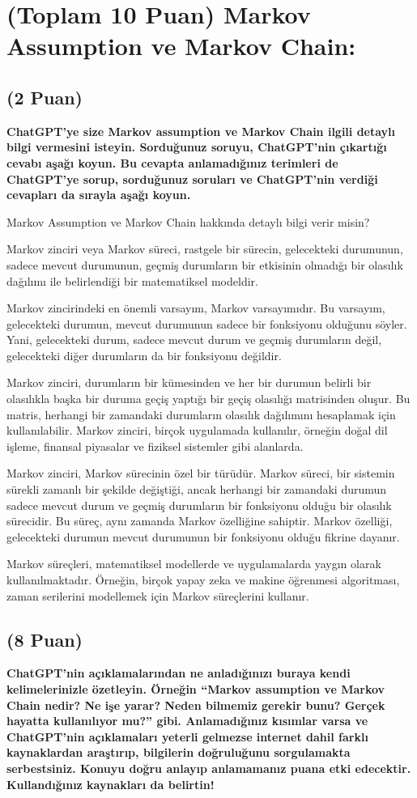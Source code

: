 \documentclass[11pt]{article}
\begin{document}
\section{(Toplam 10 Puan) Markov Assumption ve Markov Chain:}

\subsection{(2 Puan)} \textbf{ChatGPT’ye size Markov assumption ve Markov Chain ilgili detaylı bilgi vermesini isteyin. Sorduğunuz soruyu, ChatGPT'nin çıkartığı cevabı aşağı koyun. Bu cevapta anlamadığınız terimleri de ChatGPT’ye sorup, sorduğunuz soruları ve ChatGPT’nin verdiği cevapları da sırayla aşağı koyun.}

Markov Assumption ve Markov Chain hakkında detaylı bilgi verir misin?

Markov zinciri veya Markov süreci, rastgele bir sürecin, gelecekteki durumunun, sadece mevcut durumunun, geçmiş durumların bir etkisinin olmadığı bir olasılık dağılımı ile belirlendiği bir matematiksel modeldir.

Markov zincirindeki en önemli varsayım, Markov varsayımıdır. Bu varsayım, gelecekteki durumun, mevcut durumunun sadece bir fonksiyonu olduğunu söyler. Yani, gelecekteki durum, sadece mevcut durum ve geçmiş durumların değil, gelecekteki diğer durumların da bir fonksiyonu değildir.

Markov zinciri, durumların bir kümesinden ve her bir durumun belirli bir olasılıkla başka bir duruma geçiş yaptığı bir geçiş olasılığı matrisinden oluşur. Bu matris, herhangi bir zamandaki durumların olasılık dağılımını hesaplamak için kullanılabilir. Markov zinciri, birçok uygulamada kullanılır, örneğin doğal dil işleme, finansal piyasalar ve fiziksel sistemler gibi alanlarda.

Markov zinciri, Markov sürecinin özel bir türüdür. Markov süreci, bir sistemin sürekli zamanlı bir şekilde değiştiği, ancak herhangi bir zamandaki durumun sadece mevcut durum ve geçmiş durumların bir fonksiyonu olduğu bir olasılık sürecidir. Bu süreç, aynı zamanda Markov özelliğine sahiptir. Markov özelliği, gelecekteki durumun mevcut durumunun bir fonksiyonu olduğu fikrine dayanır.

Markov süreçleri, matematiksel modellerde ve uygulamalarda yaygın olarak kullanılmaktadır. Örneğin, birçok yapay zeka ve makine öğrenmesi algoritması, zaman serilerini modellemek için Markov süreçlerini kullanır.


\subsection{(8 Puan)} \textbf{ChatGPT’nin açıklamalarından ne anladığınızı buraya kendi kelimelerinizle özetleyin. Örneğin ``Markov assumption ve Markov Chain nedir? Ne işe yarar? Neden bilmemiz gerekir bunu? Gerçek hayatta kullanılıyor mu?'' gibi. Anlamadığınız kısımlar varsa ve ChatGPT’nin açıklamaları yeterli gelmezse internet dahil farklı kaynaklardan araştırıp, bilgilerin doğruluğunu sorgulamakta serbestsiniz. Konuyu doğru anlayıp anlamamanız puana etki edecektir. Kullandığınız kaynakları da belirtin!}
\end{document}
